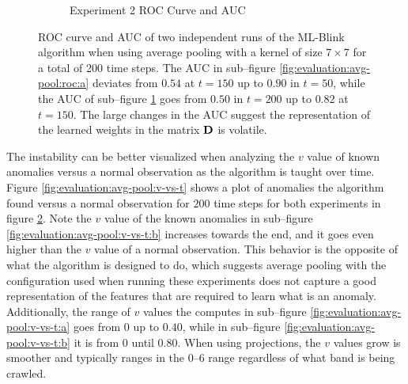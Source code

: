 \begin{figure}[H]
\begin{subfigure}{.5\textwidth}
      \caption{Experiment 2 ROC Curve and AUC}
      \label{fig:evaluation:avg-pool:roc:b}
    \end{subfigure}
    \caption{ROC curve and AUC of two independent runs of the ML-Blink algorithm when using average pooling with a kernel of size $7 \times 7$ for a total of 200 time steps. The AUC in sub--figure \ref{fig:evaluation:avg-pool:roc:a} deviates from $0.54$ at $t = 150$ up to $0.90$ in $t = 50$, while the AUC of sub--figure \ref{fig:evaluation:avg-pool:roc:b} goes from $0.50$ in $t = 200$ up to $0.82$ at $t = 150$. The large changes in the AUC suggest the representation of the learned weights in the matrix $\boldsymbol{\mathbf{D}}$ is volatile.}
    \label{fig:evaluation:avg-pool:roc}
\end{figure}

The instability can be better visualized when analyzing the $v$ value of known anomalies versus a normal observation as the \mlblink algorithm is taught over time. Figure \ref{fig:evaluation:avg-pool:v-vs-t} shows a plot of anomalies the \mlblink algorithm found versus a normal observation for $200$ time steps for both experiments in figure \ref{fig:evaluation:avg-pool:roc}. Note the $v$ value of the known anomalies in sub--figure \ref{fig:evaluation:avg-pool:v-vs-t:b} increases towards the end, and it goes even higher than the $v$ value of a normal observation. This behavior is the opposite of what the \mlblink algorithm is designed to do, which suggests average pooling with the configuration used when running these experiments does not capture a good representation of the features that are required to learn what is an anomaly. Additionally, the range of $v$ values the \mlblink computes in sub--figure \ref{fig:evaluation:avg-pool:v-vs-t:a} goes from $0$ up to $0.40$, while in sub--figure \ref{fig:evaluation:avg-pool:v-vs-t:b} it is from $0$ until $0.80$. When using projections, the $v$ values grow is smoother and typically ranges in the $0$--$6$ range regardless of what \panstarrs band is being crawled.

